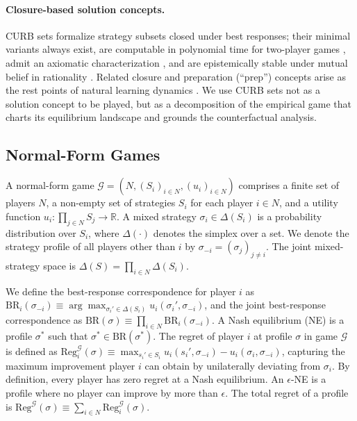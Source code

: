 \documentclass[sigconf,anonymous]{aamas}
\begin{document}
\paragraph{Closure-based solution concepts.} CURB sets \citep{Basu1991StrategySC} formalize strategy subsets closed under best responses; their minimal variants always exist, are computable in polynomial time for two-player games \citep{Benisch2010AlgorithmsFC, Klimm2009FindingAM}, admit an axiomatic characterization \citep{voorneveld2005axiomatization}, and are epistemically stable under mutual belief in rationality \citep{asheim2016epistemically}. Related closure and preparation (``prep'') concepts arise as the rest points of natural learning dynamics \citep{Hurkens1995LearningBF}. We use CURB sets not as a solution concept to be played, but as a decomposition of the empirical game that charts its equilibrium landscape and grounds the counterfactual analysis.



\subsection{Normal-Form Games}

A normal-form game $\mathcal{G} = (N, (S_i)_{i \in N}, (u_i)_{i \in N})$ comprises a finite set of players $N$, a non-empty set of strategies $S_i$
for each player $i \in N$, and a utility function $u_i : \prod_{j \in N} S_j \rightarrow \mathbb{R}$. A mixed strategy $\sigma_i \in \Delta(S_i)$ is
a probability distribution over $S_i$, where $\Delta(\cdot)$ denotes the simplex over a set. We denote the strategy profile of all players other than $i$ by $\sigma_{-i} = (\sigma_j)_{j \neq i}$. The joint mixed-strategy space is $\Delta(S) = \prod_{i \in N} \Delta(S_i)$.

We define the best-response correspondence for player $i$ as $\text{BR}_i(\sigma_{-i}) \equiv \arg\max_{\sigma_i' \in \Delta(S_i)} u_i(\sigma_i', \sigma_{-i})$, and the joint best-response correspondence as $\text{BR}(\sigma) \equiv \prod_{i \in N} \text{BR}_i(\sigma_{-i})$. A Nash equilibrium (NE) is a profile $\sigma^*$ such that $\sigma^* \in \text{BR}(\sigma^*)$. The regret of player $i$ at profile $\sigma$ in game $\mathcal{G}$ is defined as $\text{Reg}_i^{\mathcal{G}}(\sigma) \equiv \max_{s_i' \in S_i} u_i(s_i', \sigma_{-i}) - u_i(\sigma_i, \sigma_{-i})$, capturing the maximum improvement player $i$ can obtain by unilaterally deviating from $\sigma_i$. By definition, every player has zero regret at a Nash equilibrium. An $\epsilon$-NE is a profile where no player can improve by more than $\epsilon$. The total regret of a profile is $\text{Reg}^{\mathcal{G}}(\sigma) \equiv \sum_{i \in N} \text{Reg}_i^{\mathcal{G}}(\sigma)$.
\end{document}
